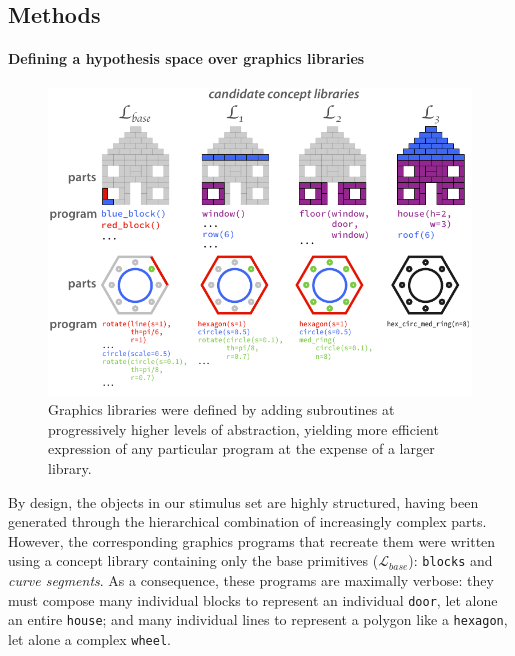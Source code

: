 \documentclass[10pt,letterpaper]{article}
\begin{document}
\subsection{Methods}
\paragraph{Defining a hypothesis space over graphics libraries} 

\begin{figure}[t]
  \begin{center}
  \includegraphics[width=0.99\linewidth]{figures/lax_libraries.pdf}
  \caption{Graphics libraries were defined by adding subroutines at progressively higher levels of abstraction, yielding more efficient expression of any particular program at the expense of a larger library.}
  \label{fig:library_gallery}
  \end{center}
\end{figure}

By design, the objects in our stimulus set are highly structured, having been generated through the hierarchical combination of increasingly complex parts.
However, the corresponding graphics programs that recreate them were written using a concept library containing only the base primitives ($\mathcal{L}_{base}$): \texttt{blocks} and \textit{curve segments}.
As a consequence, these programs are maximally verbose: they must compose many individual blocks to represent an individual \texttt{door}, let alone an entire \texttt{house}; and many individual lines to represent a polygon like a \texttt{hexagon}, let alone a complex \texttt{wheel}. 
\end{document}
